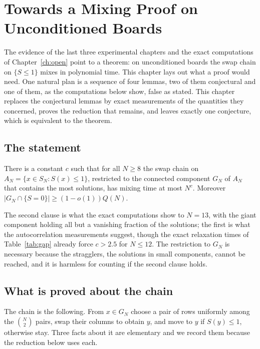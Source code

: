 \chapter{Towards a Mixing Proof on Unconditioned Boards}
\label{ch:mixingproof}

The evidence of the last three experimental chapters and the exact computations of Chapter~\ref{ch:open} point to a theorem: on unconditioned boards the swap chain on $\{ S \le 1 \}$ mixes in polynomial time. This chapter lays out what a proof would need. One natural plan is a sequence of four lemmas, two of them conjectural and one of them, as the computations below show, false as stated. This chapter replaces the conjectural lemmas by exact measurements of the quantities they concerned, proves the reduction that remains, and leaves exactly one conjecture, which is equivalent to the theorem.

\section{The statement}

\begin{conjecture}
\label{conj:mixing}
There is a constant $c$ such that for all $N \ge 8$ the swap chain on $A_N = \{ x \in S_N : S(x) \le 1 \}$, restricted to the connected component $G_N$ of $A_N$ that contains the most solutions, has mixing time at most $N^c$. Moreover $|G_N \cap \{ S = 0 \}| \ge (1 - o(1)) Q(N)$.
\end{conjecture}

The second clause is what the exact computations show to $N = 13$, with the giant component holding all but a vanishing fraction of the solutions; the first is what the autocorrelation measurements suggest, though the exact relaxation times of Table~\ref{tab:gap} already force $c > 2.5$ for $N \le 12$. The restriction to $G_N$ is necessary because the stragglers, the solutions in small components, cannot be reached, and it is harmless for counting if the second clause holds.

\section{What is proved about the chain}

The chain is the following. From $x \in G_N$ choose a pair of rows uniformly among the $\binom{N}{2}$ pairs, swap their columns to obtain $y$, and move to $y$ if $S(y) \le 1$, otherwise stay. Three facts about it are elementary and we record them because the reduction below uses each.

